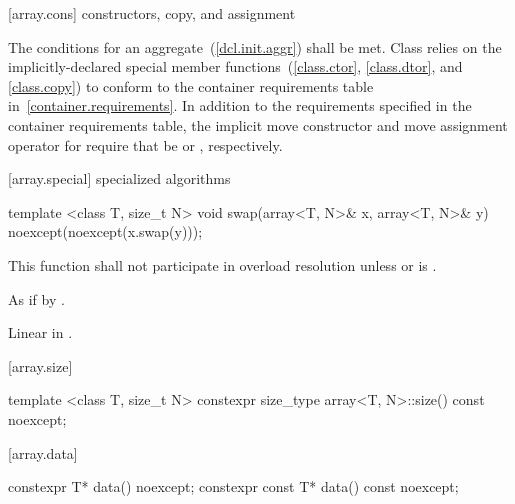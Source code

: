 [array.cons]{ constructors, copy, and assignment}

\pnum
{}%
%
The conditions for an aggregate~(\ref{dcl.init.aggr}) shall be
met. Class  relies on the implicitly-declared special
member functions~(\ref{class.ctor}, \ref{class.dtor}, and \ref{class.copy}) to
conform to the container requirements table in~\ref{container.requirements}.
In addition to the requirements specified in the container requirements table,
the implicit move constructor and move assignment operator for 
require that  be  or ,
respectively.

[array.special]{ specialized algorithms}

%
%
\begin{itemdecl}
template <class T, size_t N>
  void swap(array<T, N>& x, array<T, N>& y) noexcept(noexcept(x.swap(y)));
\end{itemdecl}

\begin{itemdescr}
\pnum\remarks
This function shall not participate in overload resolution
unless  or  is .

\pnum\effects
As if by .

\pnum
\complexity Linear in .
\end{itemdescr}

[array.size]{}

%
%
\begin{itemdecl}
template <class T, size_t N> constexpr size_type array<T, N>::size() const noexcept;
\end{itemdecl}

\begin{itemdescr}
\pnum\returns {}
\end{itemdescr}

[array.data]{}
%
%
\begin{itemdecl}
constexpr T* data() noexcept;
constexpr const T* data() const noexcept;
\end{itemdecl}

